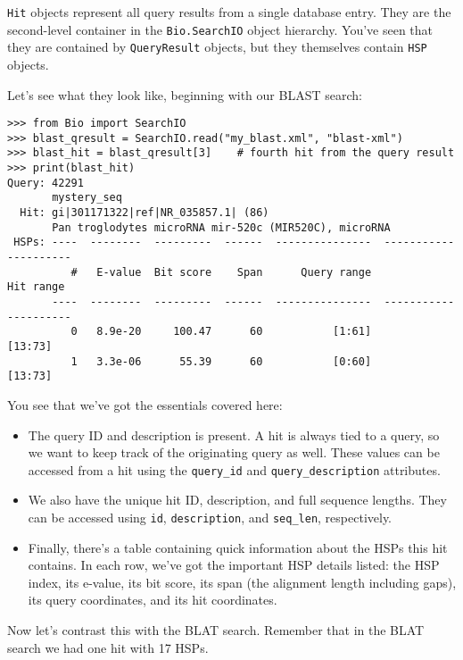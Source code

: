 \verb|Hit| objects represent all query results from a single database entry.
They are the second-level container in the \verb|Bio.SearchIO| object hierarchy.
You've seen that they are contained by \verb|QueryResult| objects, but they
themselves contain \verb|HSP| objects.

Let's see what they look like, beginning with our BLAST search:

\begin{verbatim}
>>> from Bio import SearchIO
>>> blast_qresult = SearchIO.read("my_blast.xml", "blast-xml")
>>> blast_hit = blast_qresult[3]    # fourth hit from the query result
>>> print(blast_hit)
Query: 42291
       mystery_seq
  Hit: gi|301171322|ref|NR_035857.1| (86)
       Pan troglodytes microRNA mir-520c (MIR520C), microRNA
 HSPs: ----  --------  ---------  ------  ---------------  ---------------------
          #   E-value  Bit score    Span      Query range              Hit range
       ----  --------  ---------  ------  ---------------  ---------------------
          0   8.9e-20     100.47      60           [1:61]                [13:73]
          1   3.3e-06      55.39      60           [0:60]                [13:73]
\end{verbatim}

You see that we've got the essentials covered here:

\begin{itemize}
\item The query ID and description is present. A hit is always tied to a query,
    so we want to keep track of the originating query as well. These values can
    be accessed from a hit using the \verb|query_id| and
    \verb|query_description| attributes.
\item We also have the unique hit ID, description, and full sequence lengths.
    They can be accessed using \verb|id|, \verb|description|, and
    \verb|seq_len|, respectively.
\item Finally, there's a table containing quick information about the HSPs this
    hit contains. In each row, we've got the important HSP details listed: the
    HSP index, its e-value, its bit score, its span (the alignment length
    including gaps), its query coordinates, and its hit coordinates.
\end{itemize}

Now let's contrast this with the BLAT search. Remember that in the BLAT search we
had one hit with 17 HSPs.

